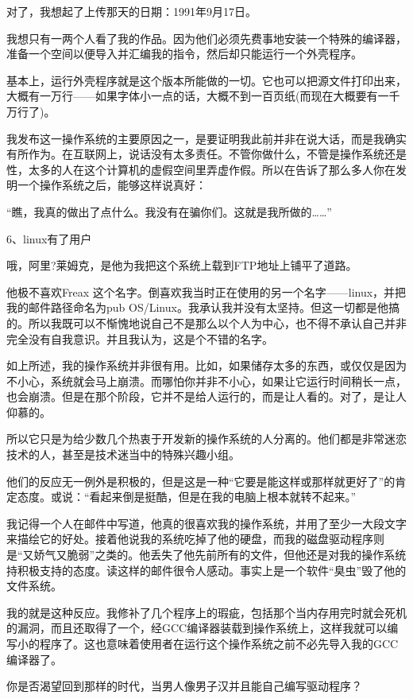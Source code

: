 对了，我想起了上传那天的日期：1991年9月17日。

我想只有一两个人看了我的作品。因为他们必须先费事地安装一个特殊的编译器，准备一个空间以便导入并汇编我的指令，然后却只能运行一个外壳程序。

基本上，运行外壳程序就是这个版本所能做的一切。它也可以把源文件打印出来，大概有一万行——如果字体小一点的话，大概不到一百页纸(而现在大概要有一千万行了)。

我发布这一操作系统的主要原因之一，是要证明我此前并非在说大话，而是我确实有所作为。在互联网上，说话没有太多责任。不管你做什么，不管是操作系统还是性，太多的人在这个计算机的虚假空间里弄虚作假。所以在告诉了那么多人你在发明一个操作系统之后，能够这样说真好：

“瞧，我真的做出了点什么。我没有在骗你们。这就是我所做的……”

 
6、linux有了用户

哦，阿里?莱姆克，是他为我把这个系统上载到FTP地址上铺平了道路。

他极不喜欢Freax 这个名字。倒喜欢我当时正在使用的另一个名字——linux，并把我的邮件路径命名为pub OS/Linux。我承认我并没有太坚持。但这一切都是他搞的。所以我既可以不惭愧地说自己不是那么以个人为中心，也不得不承认自己并非完全没有自我意识。并且我认为，这是个不错的名字。

如上所述，我的操作系统并非很有用。比如，如果储存太多的东西，或仅仅是因为不小心，系统就会马上崩溃。而哪怕你并非不小心，如果让它运行时间稍长一点，也会崩溃。但是在那个阶段，它并不是给人运行的，而是让人看的。对了，是让人仰慕的。

所以它只是为给少数几个热衷于开发新的操作系统的人分离的。他们都是非常迷恋技术的人，甚至是技术迷当中的特殊兴趣小组。

他们的反应无一例外是积极的，但是这是一种“它要是能这样或那样就更好了”的肯定态度。或说：“看起来倒是挺酷，但是在我的电脑上根本就转不起来。”

我记得一个人在邮件中写道，他真的很喜欢我的操作系统，并用了至少一大段文字来描绘它的好处。接着他说我的系统吃掉了他的硬盘，而我的磁盘驱动程序则是“又娇气又脆弱”之类的。他丢失了他先前所有的文件，但他还是对我的操作系统持积极支持的态度。读这样的邮件很令人感动。事实上是一个软件“臭虫”毁了他的文件系统。

我的就是这种反应。我修补了几个程序上的瑕疵，包括那个当内存用完时就会死机的漏洞，而且还取得了一个，经GCC编译器装载到操作系统上，这样我就可以编写小的程序了。这也意味着使用者在运行这个操作系统之前不必先导入我的GCC编译器了。

 

你是否渴望回到那样的时代，当男人像男子汉并且能自己编写驱动程序？

